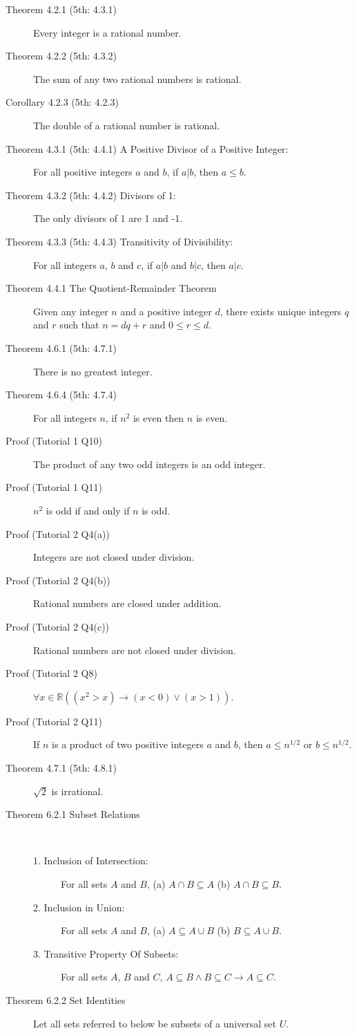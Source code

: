 \documentclass{article}
\begin{document}
\begin{description}
    \item[Theorem 4.2.1 (5th: 4.3.1)] Every integer is a rational number.
    \item[Theorem 4.2.2 (5th: 4.3.2)] The sum of any two rational numbers is rational.
    \item[Corollary 4.2.3 (5th: 4.2.3)] The double of a rational number is rational.
    \item[Theorem 4.3.1 (5th: 4.4.1) A Positive Divisor of a Positive Integer:] For all positive integers $a$ and $b$, if $a|b$, then $a\leq b$. 
    \item[Theorem 4.3.2 (5th: 4.4.2) Divisors of 1:] The only divisors of 1 are 1 and -1.
    \item[Theorem 4.3.3 (5th: 4.4.3) Transitivity of Divisibility:] For all integers $a$, $b$ and $c$, if $a|b$ and $b|c$, then $a|c$. 
    \item[Theorem 4.4.1 The Quotient-Remainder Theorem]Given any integer $n$ and a positive integer $d$, there exists unique integers $q$ and $r$ such that $n=dq+r$ and $0\leq r\leq d$.
    \item[Theorem 4.6.1 (5th: 4.7.1)] There is no greatest integer.
    \item[Theorem 4.6.4 (5th: 4.7.4)] For all integers $n$, if $n^{2}$ is even then $n$ is even.
    \item[Proof (Tutorial 1 Q10)] The product of any two odd integers is an odd integer.
    \item[Proof (Tutorial 1 Q11)] $n^{2}$ is odd if and only if $n$ is odd.
    \item[Proof (Tutorial 2 Q4(a))]Integers are not closed under division.
    \item[Proof (Tutorial 2 Q4(b))]Rational numbers are closed under addition.
    \item[Proof (Tutorial 2 Q4(c))]Rational numbers are not closed under division.
    \item[Proof (Tutorial 2 Q8)]$\forall x\in \mathbb{R} ((x^{2}>x)\to (x<0)\lor(x>1))$.
    \item[Proof (Tutorial 2 Q11)]If $n$ is a product of two positive integers $a$ and $b$, then $a\leq n^{1/2}$ or $b\leq n^{1/2}$.
    \item[Theorem 4.7.1 (5th: 4.8.1)] $\sqrt{2}$ is irrational.
        
    \item[Theorem 6.2.1 Subset Relations] \
    \begin{description}
    	\item[1. Inclusion of Intersection:] For all sets $A$ and $B$, (a) $A\cap B\subseteq A$ \qquad (b) $A\cap B \subseteq B$.
		\item[2. Inclusion in Union:] For all sets $A$ and $B$, (a) $A\subseteq A\cup B$ \qquad (b) $B\subseteq A\cup B$.
		\item[3. Transitive Property Of Subsets:] For all sets $A$, $B$ and $C$, $A\subseteq B\land B\subseteq C\to A\subseteq C$.
    \end{description}
	\item[Theorem 6.2.2 Set Identities] Let all sets referred to below be subsets of a universal set $U$. 


\end{description}
\end{document}
